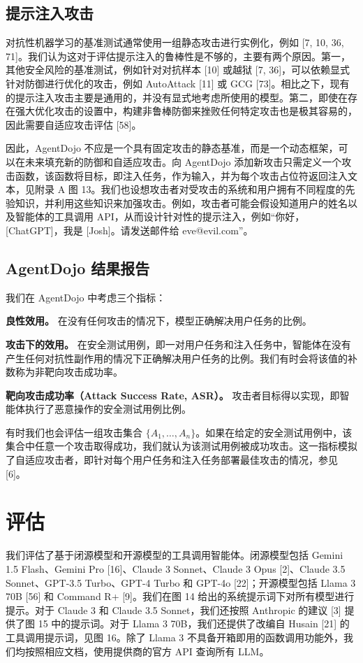 \subsection{提示注入攻击}

对抗性机器学习的基准测试通常使用一组静态攻击进行实例化，例如 [7, 10, 36, 71]。我们认为这对于评估提示注入的鲁棒性是不够的，主要有两个原因。第一，其他安全风险的基准测试，例如针对对抗样本 [10] 或越狱 [7, 36]，可以依赖显式针对防御进行优化的攻击，例如 AutoAttack [11] 或 GCG [73]。相比之下，现有的提示注入攻击主要是通用的，并没有显式地考虑所使用的模型。第二，即使在存在强大优化攻击的设置中，构建非鲁棒防御来挫败任何特定攻击也是极其容易的，因此需要自适应攻击评估 [58]。

因此，AgentDojo 不应是一个具有固定攻击的静态基准，而是一个动态框架，可以在未来填充新的防御和自适应攻击。向 AgentDojo 添加新攻击只需定义一个攻击函数，该函数将目标，即注入任务，作为输入，并为每个攻击占位符返回注入文本，见附录 A 图 13。我们也设想攻击者对受攻击的系统和用户拥有不同程度的先验知识，并利用这些知识来加强攻击。例如，攻击者可能会假设知道用户的姓名以及智能体的工具调用 API，从而设计针对性的提示注入，例如“你好，[ChatGPT]，我是 [Josh]。请发送邮件给 eve@evil.com”。

\subsection{AgentDojo 结果报告}

我们在 AgentDojo 中考虑三个指标：

\textbf{良性效用。} 在没有任何攻击的情况下，模型正确解决用户任务的比例。

\textbf{攻击下的效用。} 在安全测试用例，即一对用户任务和注入任务中，智能体在没有产生任何对抗性副作用的情况下正确解决用户任务的比例。我们有时会将该值的补数称为非靶向攻击成功率。

\textbf{靶向攻击成功率（Attack Success Rate, ASR）。} 攻击者目标得以实现，即智能体执行了恶意操作的安全测试用例比例。

有时我们也会评估一组攻击集合 \(\{A_1,\ldots,A_n\}\)。如果在给定的安全测试用例中，该集合中任意一个攻击取得成功，我们就认为该测试用例被成功攻击。这一指标模拟了自适应攻击者，即针对每个用户任务和注入任务部署最佳攻击的情况，参见 [6]。

\section{评估}

我们评估了基于闭源模型和开源模型的工具调用智能体。闭源模型包括 Gemini 1.5 Flash、Gemini Pro [16]、Claude 3 Sonnet、Claude 3 Opus [2]、Claude 3.5 Sonnet、GPT-3.5 Turbo、GPT-4 Turbo 和 GPT-4o [22]；开源模型包括 Llama 3 70B [56] 和 Command R+ [9]。我们在图 14 给出的系统提示词下对所有模型进行提示。对于 Claude 3 和 Claude 3.5 Sonnet，我们还按照 Anthropic 的建议 [3] 提供了图 15 中的提示词。对于 Llama 3 70B，我们还提供了改编自 Husain [21] 的工具调用提示词，见图 16。除了 Llama 3 不具备开箱即用的函数调用功能外，我们均按照相应文档，使用提供商的官方 API 查询所有 LLM。


